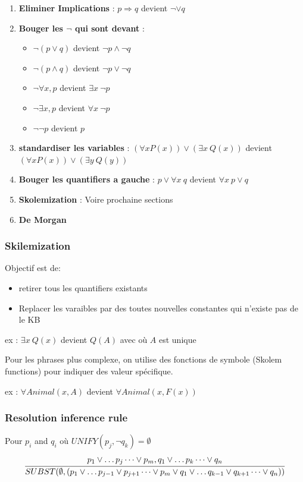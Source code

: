 \documentclass[12pt]{article}
\begin{document}
		\begin{enumerate}
			\item \textbf{Eliminer Implications} : $p \Rightarrow q$ devient $\neg  \lor q$ 
			\item \textbf{Bouger  les $\neg$ qui sont devant}  :
			\begin{itemize}
				\item $\neg(p\lor q)$ devient $\neg p \land \neg q$
				\item $\neg(p\land q)$ devient $\neg p \lor \neg q$
				\item $\neg \forall x, p$ devient $ \exists x \ \neg p$
				\item $\neg \exists x, p$ devient $\forall x\  \neg p$
				\item $\neg \neg p$ devient $p$
			\end{itemize}
			\item \textbf{standardiser les variables} : $(\forall x P(x)) \lor (\exists x \ Q(x))$ devient $(\forall x P(x)) \lor (\exists y \ Q(y))$
			\item \textbf{Bouger les quantifiers a gauche} : $p \lor \forall x \ q$ devient $\forall x \ p \lor q$
			\item \textbf{Skolemization} : Voire prochaine sections
			\item \textbf{De Morgan}
		\end{enumerate}
		
		\subsubsection{Skilemization}
			Objectif est de:
			\begin{itemize}
				\item retirer tous les quantifiers existants
				\item Replacer les varaibles par des toutes nouvelles constantes qui n'existe pas de le KB
			\end{itemize}			 
			
			ex : $\exists x \ Q(x)$ devient $Q(A)$ avec où $A$ est unique
			
			Pour les phrases plus complexe, on utilise des fonctions de symbole (Skolem functions) pour indiquer des valeur  spécifique.
			
			ex : $\forall Animal(x,A)$ devient $\forall Animal(x,F(x))$
			
		\subsubsection{Resolution inference rule}
			Pour $p_i$ and $q_i$ où $UNIFY(p_j, \neg q_k) = \emptyset$
			\begin{equation}
				\cfrac{p_1 \lor \dots p_j \dots \lor p_m, q_1 \lor \dots p_k \dots \lor q_n}{SUBST(\emptyset,(p_1 \lor \dots p_{j-1} \lor p_{j+1} \dots \lor p_m \lor q_1 \lor \dots q_{k-1} \lor q_{k+1} \dots \lor q_n))}
			\end{equation}
			
\end{document}
